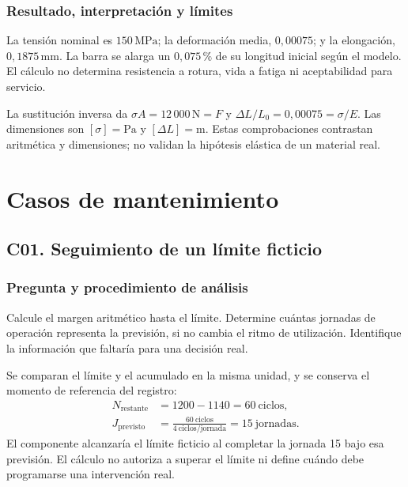 \subsection{Resultado, interpretación y límites}
La tensión nominal es $150\,\mathrm{MPa}$; la deformación media, $0{,}00075$; y la elongación, $0{,}1875\,\mathrm{mm}$. La barra se alarga un $0{,}075\,\%$ de su longitud inicial según el modelo. El cálculo no determina resistencia a rotura, vida a fatiga ni aceptabilidad para servicio.

\begin{tcolorbox}[studiumcommon,colback=studiumCheckBack,colframe=studiumCheckFrame,colbacktitle=studiumCheckFrame,coltitle=white,title={Verificación}]
La sustitución inversa da $\sigma A=12\,000\,\mathrm{N}=F$ y $\Delta L/L_0=0{,}00075=\sigma/E$. Las dimensiones son $[\sigma]=\mathrm{Pa}$ y $[\Delta L]=\mathrm{m}$. Estas comprobaciones contrastan aritmética y dimensiones; no validan la hipótesis elástica de un material real.
\end{tcolorbox}

\chapter{Casos de mantenimiento}
\section{C01. Seguimiento de un límite ficticio}

\subsection{Pregunta y procedimiento de análisis}
Calcule el margen aritmético hasta el límite. Determine cuántas jornadas de operación representa la previsión, si no cambia el ritmo de utilización. Identifique la información que faltaría para una decisión real.

Se comparan el límite y el acumulado en la misma unidad, y se conserva el momento de referencia del registro:
\begin{align}
N_{\mathrm{restante}}&=1200-1140=60\ \text{ciclos},\\
J_{\mathrm{previsto}}&=\frac{60\ \text{ciclos}}{4\ \text{ciclos/jornada}}=15\ \text{jornadas}.
\end{align}
El componente alcanzaría el límite ficticio al completar la jornada 15 bajo esa previsión. El cálculo no autoriza a superar el límite ni define cuándo debe programarse una intervención real.

